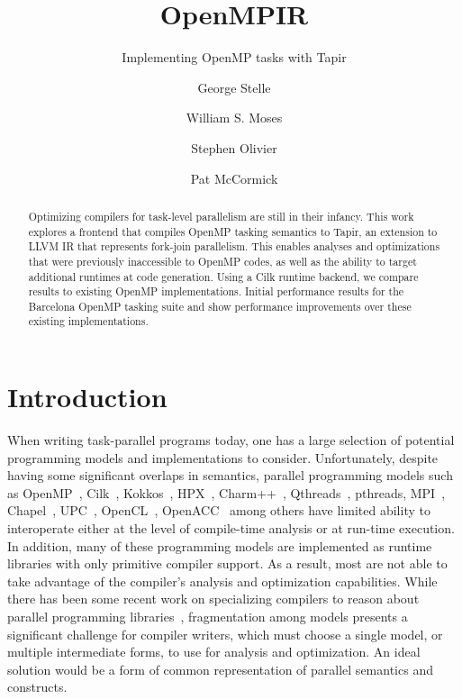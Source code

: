 \documentclass[sigconf]{acmart}
\begin{document}

\title{OpenMPIR}
\subtitle{Implementing OpenMP tasks with Tapir}
\author{George Stelle}

\author{William S. Moses}

\author{Stephen Olivier}

\author{Pat McCormick}

\begin{abstract}
Optimizing compilers for task-level parallelism are still in their infancy.
This work explores a frontend that compiles OpenMP tasking semantics to Tapir,
an extension to LLVM IR that represents fork-join parallelism. This enables
analyses and optimizations that were previously inaccessible to OpenMP codes,
as well as the ability to target additional runtimes at code generation. Using
a Cilk runtime backend, we compare results to existing OpenMP implementations.
Initial performance results for the Barcelona OpenMP tasking suite and show
performance improvements over these existing implementations.
\end{abstract}

\maketitle

\section{Introduction} \label{Sec:Introduction}
 
When writing task-parallel programs today, one has a large selection of
potential programming models and implementations to consider. Unfortunately, 
despite having some significant overlaps in semantics, parallel programming
models such as OpenMP~\cite{openmp}, Cilk~\cite{cilk}, Kokkos~\cite{kokkos},
HPX~\cite{hpx}, Charm++~\cite{charm}, Qthreads~\cite{qthreads},
pthreads\cite{pthreads}, MPI~\cite{mpi}, Chapel~\cite{chapel}, UPC~\cite{upc},
OpenCL~\cite{opencl}, OpenACC~\cite{openacc} among others have limited ability to
interoperate either at the level of compile-time analysis or at run-time
execution. In addition, many of these programming models are implemented as
runtime libraries with only primitive compiler support. As a result, most are
not able to take advantage of the compiler's analysis and optimization
capabilities.  While there has been some recent work on specializing
compilers to reason about parallel programming libraries~\cite{Moss_2016},
fragmentation among models presents a significant challenge for compiler
writers, which must choose a single model, or multiple intermediate forms, to
use for analysis and optimization. An ideal solution would be a form of
common representation of parallel semantics and constructs.
\end{document}
